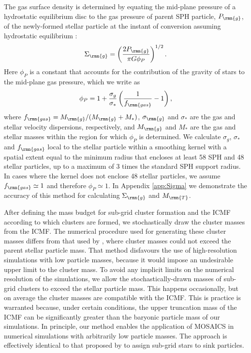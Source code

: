 \documentclass[fleqn,usenatbib]{mnras}
\begin{document}
The gas surface density is determined by equating the mid-plane pressure of a hydrostatic equilibrium disc to the gas pressure of parent SPH particle, $P_\rmn{g}$, of the newly-formed stellar particle at the instant of conversion assuming hydrostatic equilibrium \citep[cf.][]{Krumholz_and_McKee_05}: 
\begin{equation} \label{eq:Sigma_g}
\Sigma_\rmn{g} = \left( \frac{2 P_\rmn{g}}{\pi G \phi_P} \right)^{1/2} .
\end{equation}
Here $\phi_P$ is a constant that accounts for the contribution of the gravity of stars to the mid-plane gas pressure, which we write as
\begin{equation} \label{eq:phi_P}
\phi_P = 1 + \frac{\sigma_g}{\sigma_\ast} \left( \frac{1}{f_\rmn{gas}} - 1 \right) ,
\end{equation}
where $f_\rmn{gas} = M_\rmn{g}/(M_\rmn{g}+M_*)$, $\sigma_\rmn{g}$ and $\sigma_*$ are the gas and stellar velocity dispersions, respectively, and $M_\rmn{g}$ and $M_*$ are the gas and stellar masses within the region for which $\phi_P$ is determined.
We calculate $\sigma_g$, $\sigma_\ast$ and $f_\rmn{gas}$ local to the stellar particle within a smoothing kernel with a spatial extent equal to the minimum radius that encloses at least 58 SPH and 48 stellar particles, up to a maximum of 3 times the standard SPH support radius. In cases where the kernel does not enclose 48 stellar particles, we assume $f_\rmn{gas} \simeq 1$ and therefore $\phi_P \simeq 1$. In Appendix \ref{app:Sigma} we demonstrate the accuracy of this method for calculating $\Sigma_\rmn{g}$ and $M_\rmn{T}$.

After defining the mass budget for sub-grid cluster formation and the ICMF according to which clusters are formed, we stochastically draw the cluster masses from the ICMF. The numerical procedure used for generating these cluster masses differs from that used by \citet{Kruijssen_et_al_11}, where cluster masses could not exceed the parent stellar particle mass. That method disfavours the use of high-resolution simulations with low particle masses, because it would impose an undesirable upper limit to the cluster mass. To avoid any implicit limits on the numerical resolution of the simulations, we allow the stochastically-drawn masses of sub-grid clusters to exceed the stellar particle mass. This happens occasionally, but on average the cluster masses are compatible with the ICMF. This is practice is warranted because, under certain conditions, the upper truncation mass of the ICMF can be significantly greater than the baryonic particle mass of our simulations. In principle, our method enables the application of {\sc MOSAICS} in numerical simulations with arbitrarily low particle masses. The approach is effectively identical to that proposed by \citet{Sormani_et_al_17} to assign sub-grid stars to sink particles. 
\end{document}
